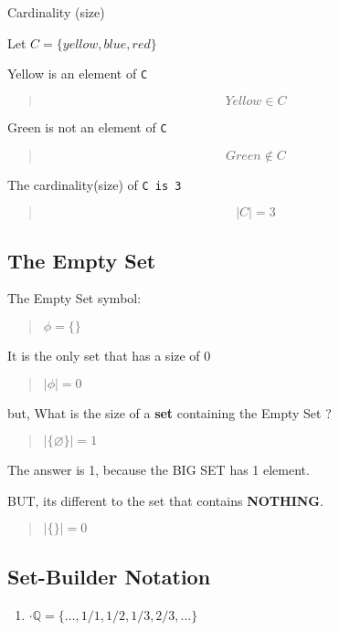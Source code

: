\documentclass[
]{article}
\providecommand{\tightlist}{%
  \setlength{\itemsep}{0pt}\setlength{\parskip}{0pt}}
\begin{document}
{Cardinality (size)}

Let {\(C = \{ yellow,blue,red\}\)}

{Yellow} is an element of \texttt{C}

\begin{quote}
{\[Yellow \in C\]}
\end{quote}

{Green} is not an element of \texttt{C}

\begin{quote}
{\[Green \notin C\]}
\end{quote}

The cardinality(size) of \texttt{C\ is\ 3}

\begin{quote}
{\[|C| = 3\]}
\end{quote}

\hypertarget{the-empty-set}{%
\subsection{The Empty Set}\label{the-empty-set}}

The Empty Set symbol:

\begin{quote}
{\(\phi = \{\}\)}
\end{quote}

It is the only set that has a size of 0

\begin{quote}
{\(|\phi| = 0\)}
\end{quote}

but, What is the size of a \textbf{set} containing {the Empty Set} ?

\begin{quote}
{\(|\{\varnothing\}| = 1\)}
\end{quote}

The answer is 1, because the BIG SET has 1 element.

BUT, it\textquotesingle s different to the set that contains
\textbf{NOTHING}.

\begin{quote}
{\(|\{\}| = 0\)}
\end{quote}

\hypertarget{set-builder-notation}{%
\subsection{Set-Builder Notation}\label{set-builder-notation}}

\begin{enumerate}
\tightlist
\item
  {\(\cdot \mathbb{Q} = \{\ldots,1/1,1/2,1/3,2/3,\ldots\}\)}
\end{enumerate}
\end{document}
